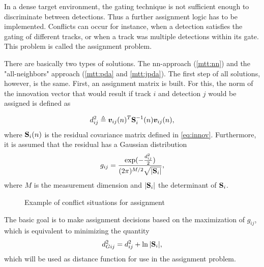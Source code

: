 In a dense target environment, the gating technique is not sufficient enough to discriminate between detections. Thus a further assignment logic has to be implemented. Conflicts can occur for instance, when a detection satisfies the gating of different tracks, or when a track was multiple detections within its gate. This problem is called the assignment problem. 

There are basically two types of solutions. The  \ac{nn}-approach (\cref{mtt:nn}) and the "all-neighbors" approach (\cref{mtt:pda} and \cref{mtt:jpda}). The first step of all solutions, however, is the same. First, an assignment matrix is built. For this, the norm of the innovation vector that would result if track $i$ and detection $j$ would be assigned is defined as 

\begin{equation}
d_{ij}^2 \triangleq \bm{v}_{ij}(n)^T \mathbf{S}_i^{-1}(n)\bm{v}_{ij}(n)\\,
\end{equation}
where $\mathbf{S}_i(n)$ is the residual covariance matrix defined in \cref{eq:innov}. Furthermore, it is assumed that the residual has a Gaussian distribution
\begin{equation}
	g_{ij} =\frac{\exp(-\frac{d_{ij}^2}{2})}{(2\pi)^{M/2}\sqrt{|\mathbf{S}_i|}}\\,
\end{equation}
where $M$ is the measurement dimension and $|\mathbf{S}_i|$ the determinant of $\mathbf{S}_i$.
\begin{figure}[h]
	\centering
	
	\caption{Example of conflict situations for assignment}
	\label{fig:assign}
\end{figure} 

The basic goal is to make assignment decisions based on the maximization of $g_{ij}$, which is equivalent to minimizing the quantity 
\begin{equation}
	d_{Gij}^2 = d_{ij}^2 + \ln |\mathbf{S}_i|\\,
\end{equation}
which will be used as distance function for use in the assignment problem.


